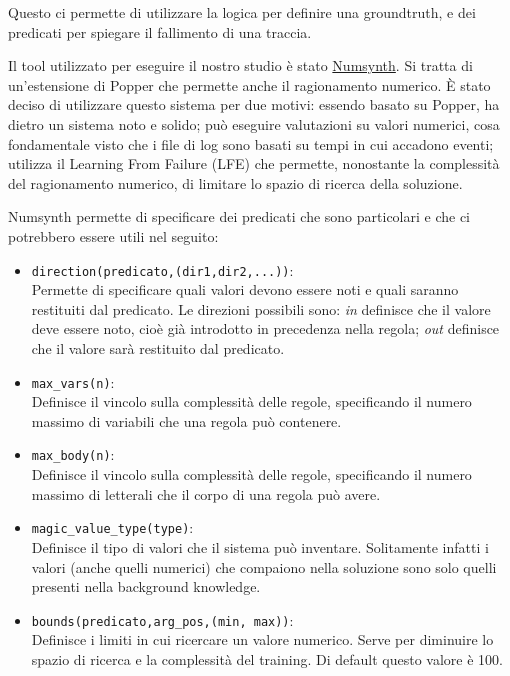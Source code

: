 Questo ci permette di utilizzare la logica per definire una groundtruth, e dei predicati per spiegare il fallimento di una traccia.

\myskip

Il tool utilizzato per eseguire il nostro studio è stato \href{https://github.com/celinehocquette/numsynth-aaai23}{Numsynth}. Si tratta di un'estensione di Popper che permette anche il ragionamento numerico. È stato deciso di utilizzare questo sistema per due motivi: essendo basato su Popper, ha dietro un sistema noto e solido; può eseguire valutazioni su valori numerici, cosa fondamentale visto che i file di log sono basati su tempi in cui accadono eventi; utilizza il Learning From Failure (LFE) che permette, nonostante la complessità del ragionamento numerico, di limitare lo spazio di ricerca della soluzione.

Numsynth permette di specificare dei predicati che sono particolari e che ci potrebbero essere utili nel seguito:
\begin{itemize}
    \item \texttt{direction(predicato,(dir1,dir2,...))}: \\
        Permette di specificare quali valori devono essere noti e quali saranno restituiti dal predicato. Le direzioni possibili sono: \textit{in} definisce che il valore deve essere noto, cioè già introdotto in precedenza nella regola; \textit{out} definisce che il valore sarà restituito dal predicato.
    \item \texttt{max\_vars(n)}: \\
        Definisce il vincolo sulla complessità delle regole, specificando il numero massimo di variabili che una regola può contenere.
    \item \texttt{max\_body(n)}: \\
        Definisce il vincolo sulla complessità delle regole, specificando il numero massimo di letterali che il corpo di una regola può avere.
    \item \texttt{magic\_value\_type(type)}: \\
        Definisce il tipo di valori che il sistema può inventare. Solitamente infatti i valori (anche quelli numerici) che compaiono nella soluzione sono solo quelli presenti nella background knowledge.
    \item \texttt{bounds(predicato,arg\_pos,(min, max))}: \\
        Definisce i limiti in cui ricercare un valore numerico. Serve per diminuire lo spazio di ricerca e la complessità del training. Di default questo valore è 100.
\end{itemize}